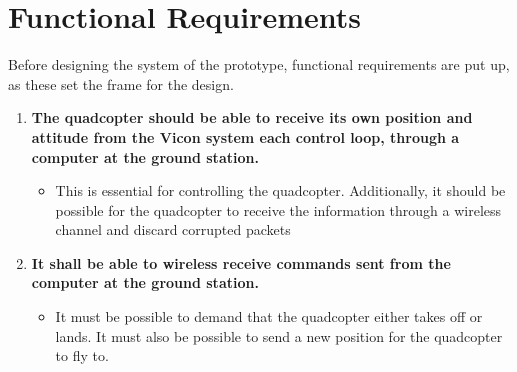 \chapter{Functional Requirements}
\label{ch:functionalRequirements}
Before designing the system of the prototype, functional requirements are put up, as these set the frame for the design.  

\begin{enumerate}[label=\textbf{\arabic*})]


\item \textbf{The quadcopter should be able to receive its own position and attitude from the Vicon system each control loop, through a computer at the ground station.}
\begin{itemize}
\item[] %
This is essential for controlling the quadcopter. Additionally, it should be possible for the quadcopter to receive the information through a wireless channel and discard corrupted packets
\end{itemize}


\item \textbf{It shall be able to wireless receive commands sent from the computer at the ground station.}
\begin{itemize}
\item[] It must be possible to demand that the quadcopter either takes off or lands. It must also be possible to send a new position for the quadcopter to fly to.  
\end{itemize}



\end{enumerate}
